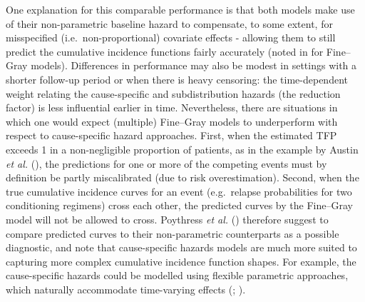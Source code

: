 \documentclass[
  letterpaper,
  DIV=11,
  numbers=noendperiod]{scrreprt}
\begin{document}
One explanation for this comparable performance is that both models make
use of their non-parametric baseline hazard to compensate, to some
extent, for misspecified (i.e.~non-proportional) covariate effects -
allowing them to still predict the cumulative incidence functions fairly
accurately (noted in
 for Fine--Gray models). Differences in performance may also be
modest in settings with a shorter follow-up period or when there is
heavy censoring: the time-dependent weight relating the cause-specific
and subdistribution hazards (the reduction factor) is less influential
earlier in time. Nevertheless, there are situations in which one would
expect (multiple) Fine--Gray models to underperform with respect to
cause-specific hazard approaches. First, when the estimated TFP exceeds
1 in a non-negligible proportion of patients, as in the example by
Austin \emph{et al.}
(), the
predictions for one or more of the competing events must by definition
be partly miscalibrated (due to risk overestimation). Second, when the
true cumulative incidence curves for an event (e.g.~relapse
probabilities for two conditioning regimens) cross each other, the
predicted curves by the Fine--Gray model will not be allowed to cross.
Poythress \emph{et al.}
() therefore
suggest to compare predicted curves to their non-parametric counterparts
as a possible diagnostic, and note that cause-specific hazards models
are much more suited to capturing more complex cumulative incidence
function shapes. For example, the cause-specific hazards could be
modelled using flexible parametric approaches, which naturally
accommodate time-varying effects
(;
).
\end{document}
